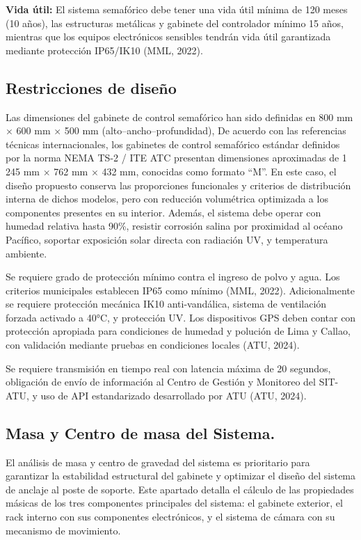 \documentclass[12pt,a4paper,oneside]{report}
\begin{document}
\textbf{Vida útil:} El sistema semafórico debe tener una vida útil mínima de 120 meses (10 años), las estructuras metálicas y gabinete del controlador mínimo 15 años, mientras que los equipos electrónicos sensibles tendrán vida útil garantizada mediante protección IP65/IK10 (MML, 2022).

\subsection{Restricciones de diseño}\label{restricciones-de-diseuxf1o}

Las dimensiones del gabinete de control semafórico han sido definidas en 800 mm \ensuremath{\times} 600 mm \ensuremath{\times} 500 mm (alto--ancho--profundidad), De acuerdo con las referencias técnicas internacionales, los gabinetes de control semafórico estándar definidos por la norma NEMA TS-2 / ITE ATC presentan dimensiones aproximadas de 1 245 mm \ensuremath{\times} 762 mm \ensuremath{\times} 432 mm, conocidas como formato ``M''. En este caso, el diseño propuesto conserva las proporciones funcionales y criterios de distribución interna de dichos modelos, pero con reducción volumétrica optimizada a los componentes presentes en su interior. Además, el sistema debe operar con humedad relativa hasta 90\%, resistir corrosión salina por proximidad al océano Pacífico, soportar exposición solar directa con radiación UV, y temperatura ambiente.

Se requiere grado de protección mínimo contra el ingreso de polvo y agua. Los criterios municipales establecen IP65 como mínimo (MML, 2022). Adicionalmente se requiere protección mecánica IK10 anti-vandálica, sistema de ventilación forzada activado a 40°C, y protección UV. Los dispositivos GPS deben contar con protección apropiada para condiciones de humedad y polución de Lima y Callao, con validación mediante pruebas en condiciones locales (ATU, 2024).

Se requiere transmisión en tiempo real con latencia máxima de 20 segundos, obligación de envío de información al Centro de Gestión y Monitoreo del SIT-ATU, y uso de API estandarizado desarrollado por ATU (ATU, 2024).

\subsection{Masa y Centro de masa del Sistema.}\label{masa-y-centro-de-masa-del-sistema.}

El análisis de masa y centro de gravedad del sistema es prioritario para garantizar la estabilidad estructural del gabinete y optimizar el diseño del sistema de anclaje al poste de soporte. Este apartado detalla el cálculo de las propiedades másicas de los tres componentes principales del sistema: el gabinete exterior, el rack interno con sus componentes electrónicos, y el sistema de cámara con su mecanismo de movimiento.
\end{document}
